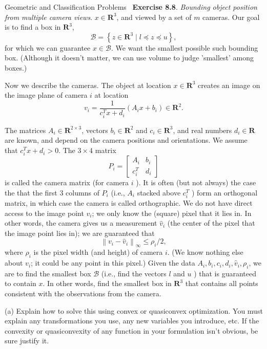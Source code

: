 \begin{chapter}{Geometric and Classification Problems}
~\cite{EE364a-extra}\textbf{Exercise 8.8}. \textit{Bounding object position from multiple camera views}.
$x \in \mathbf{R}^3$, and viewed by a set of $m$ cameras. Our goal is to find a box in $\mathbf{R}^3$,
\[
\mathcal{B}=\left\{z \in \mathbf{R}^3 \mid l \preceq z \preceq u\right\},
\]
for which we can guarantee $x \in \mathcal{B}$. We want the smallest possible such bounding box. (Although it doesn't matter, we can use volume to judge 'smallest' among boxes.)

\noindent Now we describe the cameras. The object at location $x \in \mathbf{R}^3$ creates an image on the image plane of camera $i$ at location
\[
v_i=\frac{1}{c_i^T x+d_i}\left(A_i x+b_i\right) \in \mathbf{R}^2 .
\]

\noindent The matrices $A_i \in \mathbf{R}^{2 \times 3}$, vectors $b_i \in \mathbf{R}^2$ and $c_i \in \mathbf{R}^3$, and real numbers $d_i \in \mathbf{R}$ are known, and depend on the camera positions and orientations. We assume that $c_i^T x+d_i>0$. The $3 \times 4$ matrix
\[
P_i=\left[\begin{array}{ll}
A_i & b_i \\
c_i^T & d_i
\end{array}\right]
\]
is called the camera matrix (for camera $i$ ). It is often (but not always) the case the that the first 3 columns of $P_i$ (i.e., $A_i$ stacked above $c_i^T$ ) form an orthogonal matrix, in which case the camera is called orthographic.
We do not have direct access to the image point $v_i$; we only know the (square) pixel that it lies in. In other words, the camera gives us a measurement $\hat{v}_i$ (the center of the pixel that the image point lies in); we are guaranteed that
\[
\left\|v_i-\hat{v}_i\right\|_{\infty} \leq \rho_i / 2,
\]
where $\rho_i$ is the pixel width (and height) of camera $i$. (We know nothing else about $v_i$; it could be any point in this pixel.)
Given the data $A_i, b_i, c_i, d_i, \hat{v}_i, \rho_i$, we are to find the smallest box $\mathcal{B}$ (i.e., find the vectors $l$ and $u$ ) that is guaranteed to contain $x$.
In other words, find the smallest box in $\mathbf{R}^3$ that contains all points consistent with the observations from the camera.

\vspace{0.1cm}
\noindent (a) Explain how to solve this using convex or quasiconvex optimization. You must explain any transformations you use, any new variables you introduce, etc.
If the convexity or quasiconvexity of any function in your formulation isn't obvious, be sure justify it.


\end{chapter}
